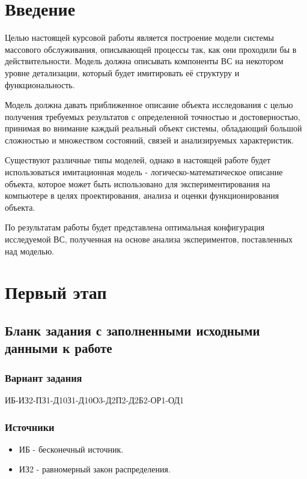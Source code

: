 \documentclass[a4paper, 14pt]{article}
\begin{document}
\large
\tableofcontents
\newpage


\section{Введение}

Целью настоящей курсовой работы является построение модели системы массового обслуживания, описывающей процессы так, как они проходили бы в действительности. Модель должна описывать компоненты ВС на некотором уровне детализации, который будет имитировать её структуру и функциональность.

Модель должна давать приближенное описание объекта исследования с целью получения требуемых результатов с определенной точностью и достоверностью, принимая во внимание каждый реальный объект системы, обладающий большой сложностью и множеством состояний, связей и анализируемых характеристик.

Существуют различные типы моделей, однако в настоящей работе будет использоваться имитационная модель - логическо-математическое описание объекта, которое может быть использовано для экспериментирования на компьютере в целях проектирования, анализа и оценки функционирования объекта.

По результатам работы будет представлена оптимальная конфигурация исследуемой ВС, полученная на основе анализа экспериментов, поставленных над моделью.

\section{Первый этап}


\subsection{Бланк задания с заполненными исходными данными к работе}

\subsubsection{Вариант задания}
ИБ-ИЗ2-ПЗ1-Д10З1-Д10О3-Д2П2-Д2Б2-ОР1-ОД1

\subsubsection{Источники}
\begin{itemize}
	\item ИБ - бесконечный источник.
	\item ИЗ2 - равномерный закон распределения.
\end{itemize}
\end{document}
